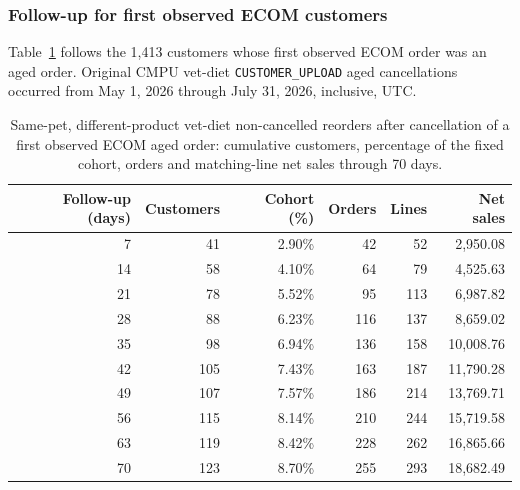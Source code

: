 \clearpage
\subsubsection{Follow-up for first observed ECOM customers}
Table~\ref{tab:financial-opportunity-new-chewy-same-pet-different-part} follows the
1,413 customers whose first observed ECOM order was an aged order. Original CMPU vet-diet
\texttt{CUSTOMER\_UPLOAD} aged cancellations occurred from
May 1, 2026 through July 31, 2026, inclusive, UTC.

\begin{table}[!htbp]
\centering
\caption{Same-pet, different-product vet-diet non-cancelled reorders after cancellation of a first observed ECOM aged order: cumulative customers, percentage of the fixed cohort, orders and matching-line net sales through 70 days.}
\label{tab:financial-opportunity-new-chewy-same-pet-different-part}
\begin{tabular}{@{}rrrrrr@{}}
\toprule
Follow-up (days) & Customers & Cohort (\%) & Orders & Lines & Net sales \\
\midrule
7 & 41 & 2.90\% & 42 & 52 & 2,950.08 \\
14 & 58 & 4.10\% & 64 & 79 & 4,525.63 \\
21 & 78 & 5.52\% & 95 & 113 & 6,987.82 \\
28 & 88 & 6.23\% & 116 & 137 & 8,659.02 \\
35 & 98 & 6.94\% & 136 & 158 & 10,008.76 \\
42 & 105 & 7.43\% & 163 & 187 & 11,790.28 \\
49 & 107 & 7.57\% & 186 & 214 & 13,769.71 \\
56 & 115 & 8.14\% & 210 & 244 & 15,719.58 \\
63 & 119 & 8.42\% & 228 & 262 & 16,865.66 \\
70 & 123 & 8.70\% & 255 & 293 & 18,682.49 \\
\bottomrule
\end{tabular}


\end{table}
